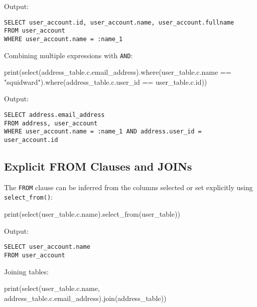 \documentclass[
  letterpaper,
  DIV=11,
  numbers=noendperiod]{scrreprt}
\newenvironment{Shaded}{\begin{snugshade}}{\end{snugshade}}
\newcommand{\BuiltInTok}[1]{\textcolor[rgb]{0.00,0.23,0.31}{#1}}
\newcommand{\NormalTok}[1]{\textcolor[rgb]{0.00,0.23,0.31}{#1}}
\newcommand{\OperatorTok}[1]{\textcolor[rgb]{0.37,0.37,0.37}{#1}}
\newcommand{\StringTok}[1]{\textcolor[rgb]{0.13,0.47,0.30}{#1}}
\begin{document}
Output:

\begin{verbatim}
SELECT user_account.id, user_account.name, user_account.fullname
FROM user_account
WHERE user_account.name = :name_1
\end{verbatim}

Combining multiple expressions with \texttt{AND}:

\begin{Shaded}
\begin{Highlighting}[]
\BuiltInTok{print}\NormalTok{(select(address\_table.c.email\_address).where(user\_table.c.name }\OperatorTok{==} \StringTok{"squidward"}\NormalTok{).where(address\_table.c.user\_id }\OperatorTok{==}\NormalTok{ user\_table.c.}\BuiltInTok{id}\NormalTok{))}
\end{Highlighting}
\end{Shaded}

Output:

\begin{verbatim}
SELECT address.email_address
FROM address, user_account
WHERE user_account.name = :name_1 AND address.user_id = user_account.id
\end{verbatim}

\subsection{Explicit FROM Clauses and
JOINs}\label{explicit-from-clauses-and-joins}

The \texttt{FROM} clause can be inferred from the columns selected or
set explicitly using \texttt{select\_from()}:

\begin{Shaded}
\begin{Highlighting}[]
\BuiltInTok{print}\NormalTok{(select(user\_table.c.name).select\_from(user\_table))}
\end{Highlighting}
\end{Shaded}

Output:

\begin{verbatim}
SELECT user_account.name
FROM user_account
\end{verbatim}

Joining tables:

\begin{Shaded}
\begin{Highlighting}[]
\BuiltInTok{print}\NormalTok{(select(user\_table.c.name, address\_table.c.email\_address).join(address\_table))}
\end{Highlighting}
\end{Shaded}
\end{document}
